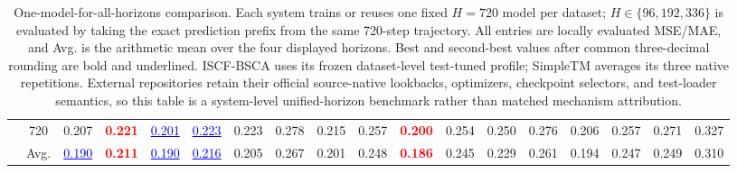 \begin{table}[t]
{\begin{tabular}{cc|cc|cc|cc|cc|cc|cc|cc|cc}
 & 720 & 0.207 & \textcolor{red}{\textbf{0.221}} & \textcolor{blue}{\underline{0.201}} & \textcolor{blue}{\underline{0.223}} & 0.223 & 0.278 & 0.215 & 0.257 & \textcolor{red}{\textbf{0.200}} & 0.254 & 0.250 & 0.276 & 0.206 & 0.257 & 0.271 & 0.327 \\
\cmidrule(lr){2-18}
 & Avg. & \textcolor{blue}{\underline{0.190}} & \textcolor{red}{\textbf{0.211}} & \textcolor{blue}{\underline{0.190}} & \textcolor{blue}{\underline{0.216}} & 0.205 & 0.267 & 0.201 & 0.248 & \textcolor{red}{\textbf{0.186}} & 0.245 & 0.229 & 0.261 & 0.194 & 0.247 & 0.249 & 0.310 \\
\bottomrule
\end{tabular}%
}
\caption{One-model-for-all-horizons comparison. Each system trains or reuses one fixed $H=720$ model per dataset; $H\in\{96,192,336\}$ is evaluated by taking the exact prediction prefix from the same 720-step trajectory. All entries are locally evaluated MSE/MAE, and Avg. is the arithmetic mean over the four displayed horizons. Best and second-best values after common three-decimal rounding are bold and underlined. ISCF-BSCA uses its frozen dataset-level test-tuned profile; SimpleTM averages its three native repetitions. External repositories retain their official source-native lookbacks, optimizers, checkpoint selectors, and test-loader semantics, so this table is a system-level unified-horizon benchmark rather than matched mechanism attribution.}
\label{tab:main_ii_h720_prefix}
\end{table}
